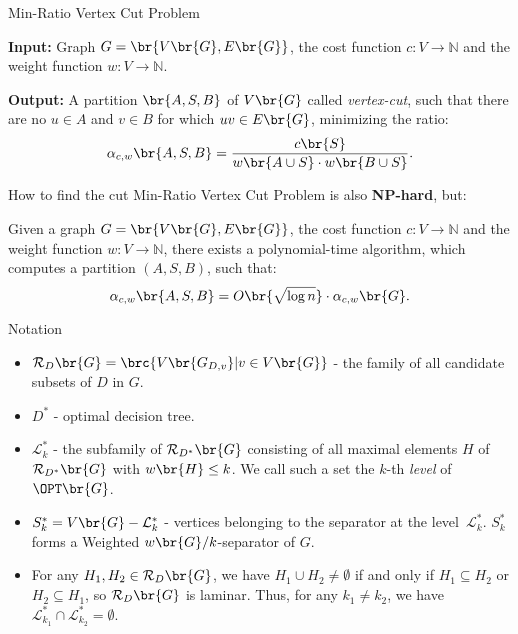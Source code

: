 \begin{frame}{Min-Ratio Vertex Cut Problem}

\begin{tcolorbox}[colback=white, title= Min-Ratio Vertex Cut Problem, fonttitle=\bfseries, breakable]
\textbf{Input:} Graph $G=\br{V\br{G}, E\br{G}}$, the cost function $c:V\to \mathbb{N}$ and the weight function $w:V\to \mathbb{N}$.

\pause
\textbf{Output:} A partition $\br{A,S,B}$ of $V\br{G}$ called \textit{vertex-cut}, such that there are no $u\in A$ and $v\in B$ for which $uv\in E\br{G}$, minimizing the ratio:
$$
\alpha_{c,w}\br{A,S,B}=\frac{c\br{S}}{w\br{A\cup S}\cdot w\br{B\cup S}}.
$$
\end{tcolorbox}
\end{frame}

\begin{frame}{How to find the cut}
Min-Ratio Vertex Cut Problem is also \textbf{NP-hard}, but:
\begin{theorem}\label{approxmrvc}
    Given a graph $G=\br{V\br{G}, E\br{G}}$, the cost function $c:V\to\mathbb{N}$ and the weight function $w:V\to \mathbb{N}$, there exists a
polynomial-time algorithm, which computes a partition $(A, S, B)$, such that:
$$
\alpha_{c,w}\br{A,S,B}=O\br{\sqrt{\log n
}}\cdot\alpha_{c,w}\br{G}.
$$
\end{theorem}
\end{frame}

\begin{frame}{Notation}
    \begin{itemize}
        \item $\mathcal{R}_D\br{G} = \brc{V\br{G_{D,v}} | v \in V\br{G}}$ - 
the family of all candidate subsets of $D$ in $G$.
        \item $D^*$ - optimal decision tree.
        \item $\mathcal{L}_{k}^*$ - the subfamily of $\mathcal{R}_{D^*}\br{G}$
        consisting of all maximal elements $H$ of $\mathcal{R}_{D^*}\br{G}$ with $w\br{H} \leq k$. We call such a set the $k$-th \textit{level} of $\OPT\br{G}$. 
        \item $S_{k}^* = V\br{G} - \mathcal{L}_{k}^*$ - vertices belonging to the separator at the level~$\mathcal{L}_{k}^*$. $S_{k}^*$ forms a Weighted $w\br{G}/k$-separator of $G$.
        \item For any $H_1, H_2 \in \mathcal{R}_D\br{G}$, we have 
$H_1 \cup H_2 \neq \emptyset$ if and only if $H_1 \subseteq H_2$ or 
$H_2 \subseteq H_1$, so $\mathcal{R}_D\br{G}$ is laminar. Thus, for any $k_1 \neq k_2$, we have 
$\mathcal{L}_{k_1}^* \cap \mathcal{L}_{k_2}^* = \emptyset$.
    \end{itemize}

\end{frame}

